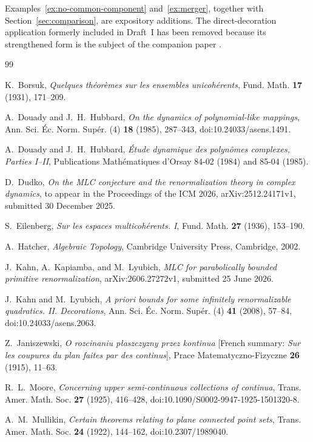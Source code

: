 \documentclass[11pt,reqno]{amsart}
\theoremstyle{definition}
\theoremstyle{remark}
\begin{document}
Examples~\ref{ex:no-common-component} and~\ref{ex:merger}, together with
Section~\ref{sec:comparison}, are expository additions.  The
direct-decoration application formerly included in Draft~I has been removed
because its strengthened form is the subject of the companion paper
\cite{Wes26}.

\begin{thebibliography}{99}

K.~Borsuk,
\emph{Quelques th\'eor\`emes sur les ensembles unicoh\'erents},
Fund. Math. \textbf{17} (1931), 171--209.

A.~Douady and J.~H.~Hubbard,
\emph{On the dynamics of polynomial-like mappings},
Ann. Sci. \'Ec. Norm. Sup\'er. (4) \textbf{18} (1985), 287--343,
doi:10.24033/asens.1491.

A.~Douady and J.~H.~Hubbard,
\emph{\'Etude dynamique des polyn\^omes complexes, Parties I--II},
Publications Math\'ematiques d'Orsay 84-02 (1984) and 85-04 (1985).

D.~Dudko,
\emph{On the MLC conjecture and the renormalization theory in complex
dynamics},
to appear in the Proceedings of the ICM 2026,
arXiv:2512.24171v1, submitted 30 December 2025.

S.~Eilenberg,
\emph{Sur les espaces multicoh\'erents. I},
Fund. Math. \textbf{27} (1936), 153--190.

A.~Hatcher,
\emph{Algebraic Topology},
Cambridge University Press, Cambridge, 2002.

J.~Kahn, A.~Kapiamba, and M.~Lyubich,
\emph{MLC for parabolically bounded primitive renormalization},
arXiv:2606.27272v1, submitted 25 June 2026.

J.~Kahn and M.~Lyubich,
\emph{A priori bounds for some infinitely renormalizable quadratics.
II. Decorations},
Ann. Sci. \'Ec. Norm. Sup\'er. (4) \textbf{41} (2008), 57--84,
doi:10.24033/asens.2063.

Z.~Janiszewski,
\emph{O rozcinaniu p\l aszczyzny przez kontinua}
[French summary: \emph{Sur les coupures du plan faites par des continus}],
Prace Matematyczno-Fizyczne \textbf{26} (1915), 11--63.

R.~L.~Moore,
\emph{Concerning upper semi-continuous collections of continua},
Trans. Amer. Math. Soc. \textbf{27} (1925), 416--428,
doi:10.1090/S0002-9947-1925-1501320-8.

A.~M.~Mullikin,
\emph{Certain theorems relating to plane connected point sets},
Trans. Amer. Math. Soc. \textbf{24} (1922), 144--162,
doi:10.2307/1989040.


\end{thebibliography}
\end{document}
